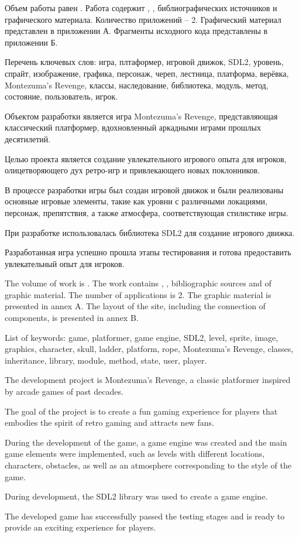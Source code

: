 
Объем работы равен . Работа содержит , ,  библиографических источников и  графического материала. Количество приложений – 2. Графический материал представлен в приложении А. Фрагменты исходного кода представлены в приложении Б.

Перечень ключевых слов: игра, плтаформер, игровой движок, SDL2, уровень, спрайт, изображение, графика, персонаж, череп, лестница, платформа, верёвка, Montezuma’s Revenge, классы, наследование, библиотека, модуль, метод, состояние, пользователь, игрок.

Объектом разработки является игра Montezuma’s Revenge, представляющая классический платформер, вдохновленный аркадными играми прошлых десятилетий.

Целью проекта является создание увлекательного игрового опыта для игроков, олицетворяющего дух ретро-игр и привлекающего новых поклонников.

В процессе разработки игры был создан игровой движок  и были реализованы основные игровые элементы, такие как уровни с различными локациями, персонаж, препятствия, а также атмосфера, соответствующая стилистике игры.

При разработке использовалась библиотека SDL2 для создание игрового движка.

Разработанная игра успешно прошла этапы тестирования и готова предоставить увлекательный опыт для игроков.

  
The volume of work is . The work contains , ,  bibliographic sources and  of graphic material. The number of applications is 2. The graphic material is presented in annex A. The layout of the site, including the connection of components, is presented in annex B.

List of keywords: game, platformer, game engine, SDL2, level, sprite, image, graphics, character, skull, ladder, platform, rope, Montezuma’s Revenge, classes, inheritance, library, module, method, state, user, player.

The development project is Montezuma's Revenge, a classic platformer inspired by arcade games of past decades.

The goal of the project is to create a fun gaming experience for players that embodies the spirit of retro gaming and attracts new fans.

During the development of the game, a game engine was created and the main game elements were implemented, such as levels with different locations, characters, obstacles, as well as an atmosphere corresponding to the style of the game.

During development, the SDL2 library was used to create a game engine.

The developed game has successfully passed the testing stages and is ready to provide an exciting experience for players.
